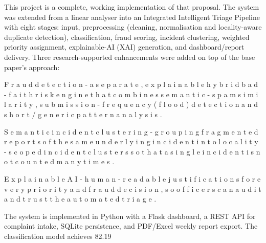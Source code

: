 \documentclass[10pt,letterpaper,oneside]{article}\usepackage{geometry}\geometry{top=1in,bottom=1in,left=1in,right=1in,includeheadfoot}\usepackage{xcolor}\definecolor{color@navy}{HTML}{1F3B63}\definecolor{color@grey}{HTML}{404040}\definecolor{color@hdr}{HTML}{F2F4F7}\usepackage{titlesec}\titleformat{\section}  {\normalfont\huge\bfseries\color@navy}  {}{0pt}{\MakeUppercase}\titleformat{\subsection}  {\normalfont\Large\bfseries\color@navy}  {}{0pt}{}\titleformat{\subsubsection}  {\normalfont\large\bfseries\color@navy}  {}{0pt}{}\titlespacing*{\section}{0pt}{14pt}{6pt}\titlespacing*{\subsection}{0pt}{10pt}{4pt}\titlespacing*{\subsubsection}{0pt}{8pt}{3pt}\setlength{\parindent}{0pt}\setlength{\parskip}{0.6em}\parindent=0pt\usepackage{enumitem}\setlist{nosep,leftmargin=*,itemsep=0pt,topsep=2pt,partopsep=0pt}\usepackage{array}\usepackage{booktabs}\usepackage{caption}\captionsetup{font={small,it},labelfont={bf},labelsep=period,  parskip=2pt,skip=4pt,list=no}\captionsetup[table]{labelfont={bf,small,color@navy},name=Table}\usepackage{graphicx}\usepackage{verbatim}\usepackage{ragged2e}\usepackage{longtable}\usepackage{tabularx}\usepackage{multirow}\usepackage{colortbl}\definecolor{rowshade}{HTML}{F2F4F7}\usepackage{tikz}\usetikzlibrary{positioning,calc}\usepackage[hidelinks]{hyperref}\hypersetup{colorlinks=true,linkcolor=color@navy,urlcolor=color@navy}\pagestyle{fancy}\fancyhf{}\renewcommand{\headrulewidth}{0.4pt}\fancyhead[L]{\small\color@navy CivicSense — Project Report}\fancyhead[R]{\small\color@grey October 11, 2026}\fancyfoot[C]{\small\color@grey An Integrated Intelligent Triage Pipelin}\fancyfoot[R]{\small\color@grey Page \thepage}\usepackage{setspace}\setstretch{1.15}\AtBeginDocument{  \hypersetup{pdftitle={An Integrated Intelligent Triage Pipeline for AI-Enhanced Citizen Complaint Management},    pdfauthor={CivicSense Project Team},    pdfsubject={Project Report},    pdfkeywords={smart cities, NLP, complaint management, e-governance},    pdfcreator={CivicSense Project Team}  }}
\begin{document}
This project is a complete, working implementation of that proposal. The system was extended from a linear analyser into an Integrated Intelligent Triage Pipeline with eight stages: input, preprocessing (cleaning, normalisation and locality-aware duplicate detection), classification, fraud scoring, incident clustering, weighted priority assignment, explainable-AI (XAI) generation, and dashboard/report delivery. Three research-supported enhancements were added on top of the base paper’s approach:

\item F r a u d   d e t e c t i o n   -   a   s e p a r a t e ,   e x p l a i n a b l e   h y b r i d   b a d - f a i t h   r i s k   e n g i n e   t h a t   c o m b i n e s   s e m a n t i c - s p a m   s i m i l a r i t y ,   s u b m i s s i o n - f r e q u e n c y   ( f l o o d )   d e t e c t i o n   a n d   s h o r t / g e n e r i c   p a t t e r n   a n a l y s i s .

\item S e m a n t i c   i n c i d e n t   c l u s t e r i n g   -   g r o u p i n g   f r a g m e n t e d   r e p o r t s   o f   t h e   s a m e   u n d e r l y i n g   i n c i d e n t   i n t o   l o c a l i t y - s c o p e d   i n c i d e n t   c l u s t e r s   s o   t h a t   a   s i n g l e   i n c i d e n t   i s   n o t   c o u n t e d   m a n y   t i m e s .

\item E x p l a i n a b l e   A I   -   h u m a n - r e a d a b l e   j u s t i f i c a t i o n s   f o r   e v e r y   p r i o r i t y   a n d   f r a u d   d e c i s i o n ,   s o   o f f i c e r s   c a n   a u d i t   a n d   t r u s t   t h e   a u t o m a t e d   t r i a g e .

The system is implemented in Python with a Flask dashboard, a REST API for complaint intake, SQLite persistence, and PDF/Excel weekly report export. The classification model achieves 82.19%
\end{document}
